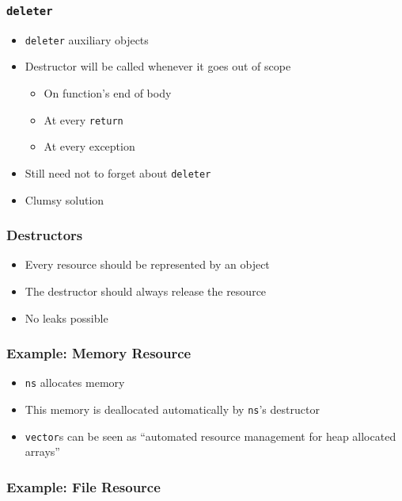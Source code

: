 \begin{frame}
\end{frame}

\begin{frame}
  \frametitle{\tt deleter}
  \begin{itemize}
    \item {\tt deleter} auxiliary objects
    \item Destructor will be called whenever it goes out of scope
          \begin{itemize}
            \item On function's end of body
            \item At every {\tt return}
            \item At every exception
          \end{itemize}
    \item Still need not to forget about {\tt deleter}
    \item Clumsy solution
  \end{itemize}
\end{frame}

\begin{frame}
\end{frame}

\begin{frame}
  \frametitle{Destructors}
  \begin{itemize}
    \item Every resource should be represented by an object
    \item The destructor should always release the resource
    \item No leaks possible
  \end{itemize}
\end{frame}

\begin{frame}
  \frametitle{Example: Memory Resource}
  \begin{itemize}
    \item {\tt ns} allocates memory
    \item This memory is deallocated automatically by {\tt ns}'s destructor
    \item {\tt vector}s can be seen as ``automated resource management for heap allocated arrays''
  \end{itemize}
\end{frame}

\begin{frame}
  \frametitle{Example: File Resource}
\end{frame}




